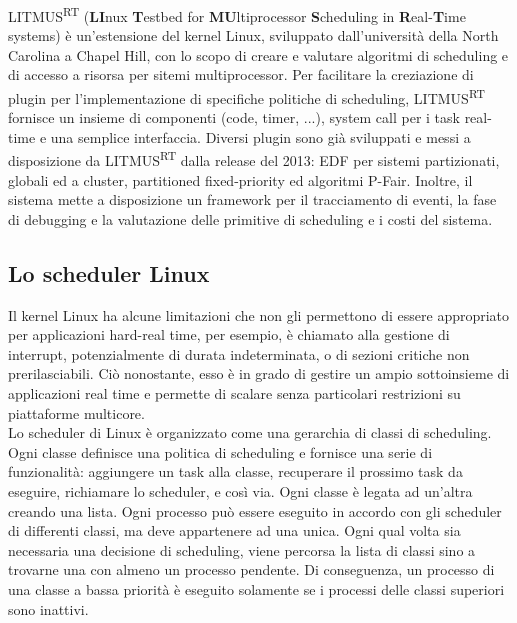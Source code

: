 LITMUS\textsuperscript{RT} (\textbf{LI}nux \textbf{T}estbed for \textbf{MU}ltiprocessor \textbf{S}cheduling in \textbf{R}eal-\textbf{T}ime systems) è un'estensione del kernel Linux, sviluppato dall'università della North Carolina a Chapel Hill, con lo scopo di creare e valutare algoritmi di scheduling e di accesso a risorsa per sitemi multiprocessor. Per facilitare la creziazione di plugin per l'implementazione di specifiche politiche di scheduling, LITMUS\textsuperscript{RT} fornisce un insieme di componenti (code, timer, ...), system call per i task real-time e una semplice interfaccia. Diversi plugin sono già sviluppati e messi a disposizione da LITMUS\textsuperscript{RT} dalla release del 2013: EDF per sistemi partizionati, globali ed a cluster, partitioned fixed-priority ed algoritmi P-Fair. Inoltre, il sistema mette a disposizione un framework per il tracciamento di eventi, la fase di debugging e la valutazione delle primitive di scheduling e i costi del sistema.

\subsection{Lo scheduler Linux}
\label{sec:intro.linuxSched}

Il kernel Linux ha alcune limitazioni che non gli permettono di essere appropriato per applicazioni hard-real time, per esempio, è chiamato alla gestione di interrupt, potenzialmente di durata indeterminata, o di sezioni critiche non prerilasciabili. Ciò nonostante, esso è in grado di gestire un ampio sottoinsieme di applicazioni real time e permette di scalare senza particolari restrizioni su piattaforme multicore.\\

Lo scheduler di Linux è organizzato come una gerarchia di classi di scheduling. Ogni classe definisce una politica di scheduling e fornisce una serie di funzionalità: aggiungere un task alla classe, recuperare il prossimo task da eseguire, richiamare lo scheduler, e così via. Ogni classe è legata ad un'altra creando una lista. Ogni processo può essere eseguito in accordo con gli scheduler di differenti classi, ma deve appartenere ad una unica. Ogni qual volta sia necessaria una decisione di scheduling, viene percorsa la lista di classi sino a trovarne una con almeno un processo pendente. Di conseguenza, un processo di una classe a bassa priorità è eseguito solamente se i processi delle classi superiori sono inattivi.\\

